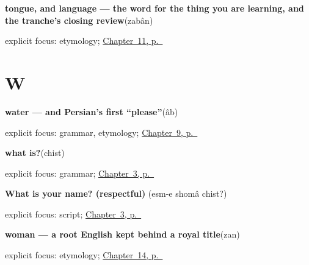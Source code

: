 \noindent\begin{minipage}[t]{\linewidth}
\raggedright
\textbf{tongue, and language — the word for the thing you are learning, and the tranche's closing review}\enspace\emph{}\enspace(zabân)\par
\footnotesize explicit focus: etymology; \hyperref[ch:fa-body]{Chapter~11, p.~\pageref*{ch:fa-body}}
\end{minipage}\par\smallskip

\section*{W}

\noindent\begin{minipage}[t]{\linewidth}
\raggedright
\textbf{water — and Persian's first \textquotedblleft{}please\textquotedblright{}}\enspace\emph{}\enspace(âb)\par
\footnotesize explicit focus: grammar, etymology; \hyperref[ch:fa-please-requests]{Chapter~9, p.~\pageref*{ch:fa-please-requests}}
\end{minipage}\par\smallskip

\noindent\begin{minipage}[t]{\linewidth}
\raggedright
\textbf{what is?}\enspace\emph{}\enspace(chist)\par
\footnotesize explicit focus: grammar; \hyperref[ch:fa-ask-and-answer-names]{Chapter~3, p.~\pageref*{ch:fa-ask-and-answer-names}}
\end{minipage}\par\smallskip

\noindent\begin{minipage}[t]{\linewidth}
\raggedright
\textbf{What is your name? (respectful)}\enspace\emph{  }\enspace(esm-e shomâ chist?)\par
\footnotesize explicit focus: script; \hyperref[ch:fa-ask-and-answer-names]{Chapter~3, p.~\pageref*{ch:fa-ask-and-answer-names}}
\end{minipage}\par\smallskip

\noindent\begin{minipage}[t]{\linewidth}
\raggedright
\textbf{woman — a root English kept behind a royal title}\enspace\emph{}\enspace(zan)\par
\footnotesize explicit focus: etymology; \hyperref[ch:fa-people-words]{Chapter~14, p.~\pageref*{ch:fa-people-words}}
\end{minipage}\par\smallskip

